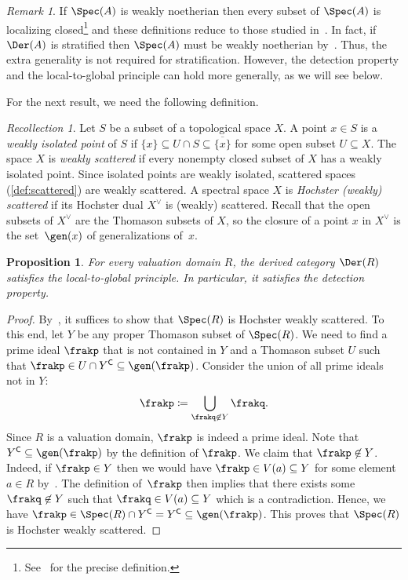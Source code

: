 \documentclass{amsart}
\numberwithin{equation}{section}%
\newtheorem{Prop}[equation]{Proposition}
\theoremstyle{remark}
\newtheorem{Rem}[equation]{Remark}
\newtheorem{Rec}[equation]{Recollection}
\renewcommand{\complement}{{\mkern-1mu\mathsf{C}}}
\renewcommand{\complement}{{\mathsf{C}}}
\begin{document}
\begin{Rem}
	If $\Spec(A)$ is weakly noetherian then every subset of $\Spec(A)$ is localizing closed\footnote{See~\cite[Remark~2.7]{Zou25} for the precise definition.} and these definitions reduce to those studied in~\cite{BarthelHeardSanders23a}. In fact, if~$\Der(A)$ is stratified then $\Spec(A)$ must be weakly noetherian by~\cite[Theorem~A]{Zou25}. Thus, the extra generality is not required for stratification. However, the detection property and the local-to-global principle can hold more generally, as we will see below.
\end{Rem}

For the next result, we need the following definition. 

\begin{Rec}\label{rec:weakly-scattered}
	Let $S$ be a subset of a topological space $X$. A point $x \in S$ is a \emph{weakly isolated point} of $S$ if $\{x\} \subseteq U \cap S \subseteq \overbar{\{x\}}$ for some open subset $U \subseteq X$. The space $X$ is \emph{weakly scattered} if every nonempty closed subset of $X$ has a weakly isolated point. Since isolated points are weakly isolated, scattered spaces (\cref{def:scattered}) are weakly scattered. A spectral space $X$ is \emph{Hochster (weakly) scattered} if its Hochster dual $X^\vee$ is (weakly) scattered. Recall that the open subsets of $X^\vee$ are the Thomason subsets of $X$, so the closure of a point $x$ in $X^\vee$ is the set~$\gen(x)$ of generalizations of~$x$.
\end{Rec}

\begin{Prop}\label{prop:LGP}
	For every valuation domain $R$, the derived category $\Der(R)$ satisfies the local-to-global principle. In particular, it satisfies the detection property.
\end{Prop}

\begin{proof}
	By~\cite[Theorem~7.6]{Zou25}, it suffices to show that $\Spec(R)$ is Hochster weakly scattered. To this end, let $Y$ be any proper Thomason subset of $\Spec(R)$. We need to find a prime ideal $\frakp$ that is not contained in $Y$ and a Thomason subset $U$ such that $\frakp \in U \cap Y^\complement \subseteq \gen(\frakp)$. Consider the union of all prime ideals not in $Y$:
	\[
		\frakp \coloneqq \bigcup_{\frakq \not\in Y} \frakq.
	\]
	Since $R$ is a valuation domain, $\frakp$ is indeed a prime ideal. Note that $Y^\complement \subseteq \gen(\frakp)$ by the definition of $\frakp$. We claim that $\frakp \not\in Y$. Indeed, if $\frakp \in Y$ then we would have $\frakp \in V(a) \subseteq Y$ for some element $a \in R$ by~. The definition of~$\frakp$ then implies that there exists some $\frakq \not\in Y$ such that $\frakq \in V(a) \subseteq Y$ which is a contradiction. Hence, we have $\frakp \in \Spec(R) \cap Y^\complement = Y^\complement \subseteq \gen(\frakp)$. This proves that $\Spec(R)$ is Hochster weakly scattered.
\end{proof}
\end{document}
